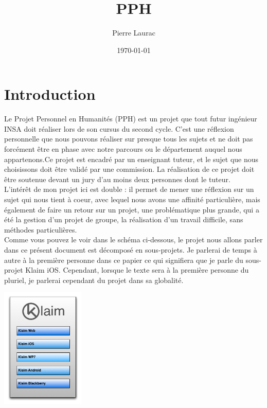 \documentclass{article}
\title{PPH}
\author{Pierre Laurac}
\date\today
\begin{document}
\maketitle

\newpage
\tableofcontents


\newpage
\section{Introduction}
Le Projet Personnel en Humanités (PPH) est un projet que tout futur ingénieur INSA doit réaliser lors de son cursus du second cycle. C'est une réflexion personnelle que nous pouvons réaliser sur presque tous les sujets et ne doit pas forcément être en phase avec notre parcours ou le département auquel nous appartenons.Ce projet est encadré par un enseignant tuteur, et le sujet que nous choisissons doit être validé par une commission. La réalisation de ce projet doit être soutenue devant un jury d'au moins deux personnes dont le tuteur. \\

L'intérêt de mon projet ici est double : il permet de mener une réflexion sur un sujet qui nous tient à coeur, avec lequel nous avons une affinité particulière, mais également de faire un retour sur un projet, une problématique plus grande, qui a été la gestion d'un projet de groupe, la réalisation d'un travail difficile, sans méthodes particulières.\\

Comme vous pouvez le voir dans le schéma ci-dessous, le projet nous allons parler dans ce présent document est décomposé en sous-projets. Je parlerai de temps à autre à la première personne dans ce papier ce qui signifiera que je parle du sous-projet Klaim iOS. Cependant, lorsque le texte sera à la première personne du pluriel, je parlerai cependant du projet dans sa globalité.

\includegraphics[width=150px]{Images/klaim.png}
\end{document}
